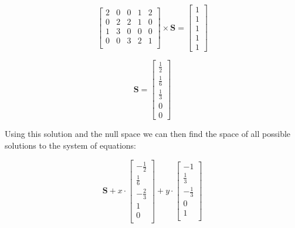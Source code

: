 \documentclass[a4paper, 12pt]{article}
\begin{document}
\vspace{1.5em}
\begin{minipage}{0.5\textwidth}
	\begin{equation*}
		\begin{bmatrix}
			2 & 0 & 0 & 1 & 2 \\
			0 & 2 & 2 & 1 & 0 \\
			1 & 3 & 0 & 0 & 0 \\
			0 & 0 & 3 & 2 & 1 \\
		\end{bmatrix}
		\times
		\mathbf{S}
		=
		\begin{bmatrix}
			1 \\
			1 \\
			1 \\
			1 \\ 
			1
		\end{bmatrix}
	\end{equation*}
\end{minipage}
\begin{minipage}{0.5\textwidth}
	\begin{equation*}
		\mathbf{S} =
		\begin{bmatrix}
			\frac{1}{2} \\[4pt]
			\frac{1}{6} \\[4pt]
			\frac{1}{3} \\[4pt]
			0 \\
			0
		\end{bmatrix}
	\end{equation*}
\end{minipage}

\vspace{0.5em} 

Using this solution and the null space we can then find the space of all possible solutions to the system of equations:

\begin{equation*}
	\mathbf{S} + x \cdot
	\begin{bmatrix}
		-\frac{1}{2} \\
		\frac{1}{6} \\
		-\frac{2}{3} \\
		1 \\
		0 \\
	\end{bmatrix}
	+ y \cdot
	\begin{bmatrix}
		-1 \\
		\frac{1}{3} \\
		-\frac{1}{3} \\
		0 \\
		1 \\
	\end{bmatrix}
\end{equation*}
\end{document}
